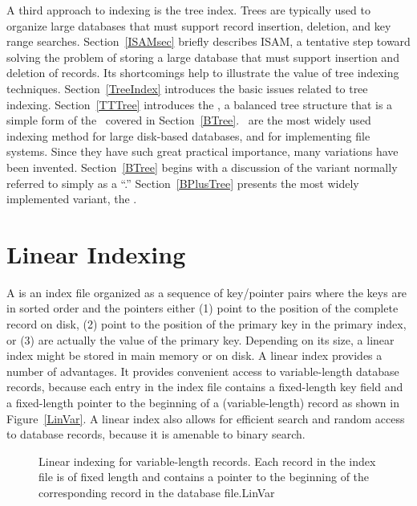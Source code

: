 A third approach to indexing is the
tree index.
Trees are typically used to organize large databases that must support
record insertion, deletion, and
key range searches.
Section~\ref{ISAMsec} briefly describes ISAM,
a tentative step toward solving the problem of storing a large
database that must support insertion and deletion of records.
Its shortcomings help to illustrate the value of tree indexing
techniques.
Section~\ref{TreeIndex} introduces the basic issues related to tree
indexing.
Section~\ref{TTTree} introduces the \TTtree, a
balanced tree structure that is a simple form of the
\Btree\ covered in Section~\ref{BTree}.
\Btrees\ are the most widely used indexing method for large disk-based
databases, and for implementing file systems.
Since they have such great practical importance, many variations have
been invented.
Section~\ref{BTree} begins with a discussion of the variant normally
referred to simply as a ``\Btree.''
Section~\ref{BPlusTree} presents the most widely implemented variant,
the \BPtree.

\newpage

\section{Linear Indexing}
\label{LinIndexSec}

A  is an index file organized as a
sequence of key/pointer pairs where the keys are in
sorted order and the pointers either (1) point to the position of the
complete record on disk, (2) point to the position of the primary
key in the primary index, or (3) are actually the value of the primary
key.
Depending on its size, a linear index might be stored in main
memory or on disk.
A linear index provides a number of advantages.
It provides convenient access to variable-length database records,
because each entry in the index file contains a fixed-length key field
and a fixed-length pointer to the beginning of a (variable-length)
record as shown in Figure~\ref{LinVar}.
A linear index also allows for efficient search and random access to
database records, because it is amenable to
binary search.

\begin{figure}

\vspace{-\medskipamount}
{Linear indexing for variable-length records.
Each record in the index file is of fixed length and contains a
pointer to the beginning of the corresponding record in the database
file.}{LinVar}
\bigskip
\medskip
\medskip
\end{figure}

